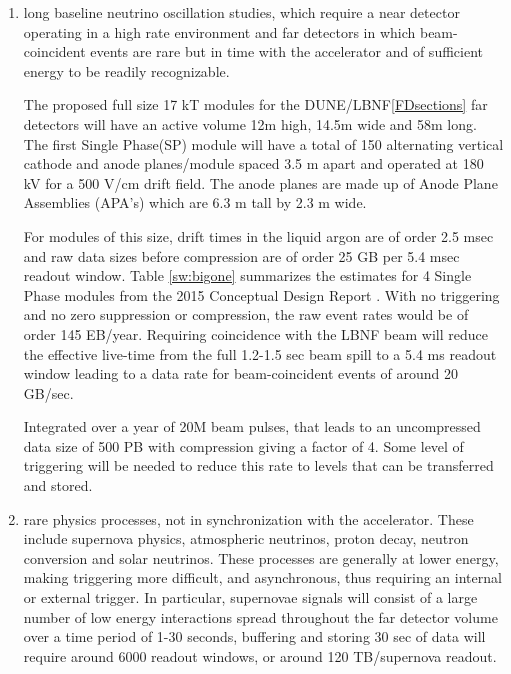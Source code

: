 \begin{enumerate}
\item long baseline neutrino oscillation studies, which require a near detector operating in a high rate environment and far detectors in which beam-coincident events are rare but in time with the accelerator and of sufficient energy to be readily recognizable.  

The proposed  full size 17 kT modules for the DUNE/LBNF\ref{FDsections} far detectors will  have an active volume 12m high, 14.5m wide and 58m long.  The first Single Phase(SP) module will have 
a total of 150 alternating vertical cathode and anode planes/module  spaced 3.5 m apart and operated at 180 kV for a 500 V/cm drift field.  The anode planes are made up of Anode Plane Assemblies  (APA's) which are 6.3 m tall by 2.3 m wide. %

For modules of this size, drift times in the liquid argon are of order 2.5 msec and raw data sizes before compression are of order 25 GB per 5.4 msec readout window. Table \ref{sw:bigone} summarizes the estimates for 4 Single Phase modules from the 2015 Conceptual Design Report \cite{17Krates}.  With no triggering and no zero suppression or compression, the raw event rates would be of order 145 EB/year. 
Requiring  coincidence with the LBNF beam will reduce the effective live-time from the full 1.2-1.5 sec beam spill to a 5.4 ms readout window leading to a data rate for beam-coincident events of around 20 GB/sec.

Integrated over a year of 20M beam pulses, that leads to an uncompressed data size of 500 PB with compression giving a factor of 4. Some level of triggering will be needed to reduce this rate to levels that can be transferred and stored.


\item rare physics processes, not in synchronization with the accelerator.  These include supernova physics, atmospheric neutrinos, proton decay, neutron conversion and solar neutrinos.  These processes are generally at lower energy, making triggering more difficult, and asynchronous, thus requiring an internal or external trigger.  In particular, supernovae signals will consist of a large number of low energy interactions spread throughout the far detector volume over a time period of 1-30 seconds, buffering and storing 30 sec of data will require around 6000 readout windows, or around 120 TB/supernova readout.  


\end{enumerate}

